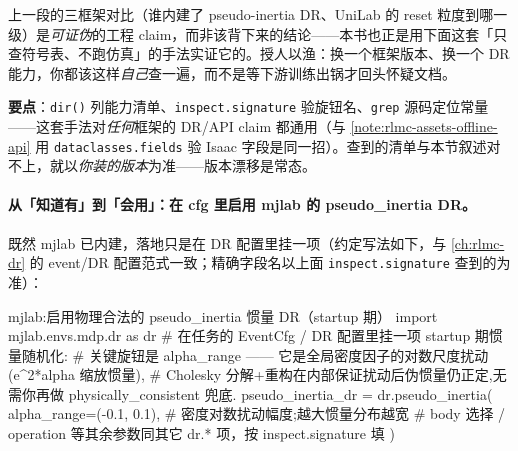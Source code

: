 \begin{note}\label{note:rlmc-assets-verify-claim}
上一段的三框架对比（谁内建了 pseudo-inertia DR、UniLab 的 reset 粒度到哪一级）是\emph{可证伪}的工程 claim，而非该背下来的结论——本书也正是用下面这套「只查符号表、不跑仿真」的手法实证它的。授人以渔：换一个框架版本、换一个 DR 能力，你都该这样\emph{自己}查一遍，而不是等下游训练出锅才回头怀疑文档。
\textbf{要点}：\texttt{dir()} 列能力清单、\texttt{inspect.\allowbreak signature} 验旋钮名、\texttt{grep} 源码定位常量——这套手法对\emph{任何}框架的 DR/API claim 都通用（与 \cref{note:rlmc-assets-offline-api} 用 \texttt{dataclasses.\allowbreak fields} 验 Isaac 字段是同一招）。查到的清单与本节叙述对不上，就以\emph{你装的版本}为准——版本漂移是常态。
\end{note}

\paragraph{从「知道有」到「会用」：在 cfg 里启用 mjlab 的 pseudo\_inertia DR。}既然 mjlab 已内建，落地只是在 DR 配置里挂一项（约定写法如下，与 \cref{ch:rlmc-dr} 的 event/DR 配置范式一致；精确字段名以上面 \texttt{inspect.\allowbreak signature} 查到的为准）：

\begin{codebox}[Python]{mjlab:启用物理合法的 pseudo\_inertia 惯量 DR（startup 期）}
import mjlab.envs.mdp.dr as dr
# 在任务的 EventCfg / DR 配置里挂一项 startup 期惯量随机化:
# 关键旋钮是 alpha_range —— 它是全局密度因子的对数尺度扰动(e^{2*alpha} 缩放惯量),
# Cholesky 分解+重构在内部保证扰动后伪惯量仍正定,无需你再做 physically_consistent 兜底.
pseudo_inertia_dr = dr.pseudo_inertia(
    alpha_range=(-0.1, 0.1),     # 密度对数扰动幅度;越大惯量分布越宽
    # body 选择 / operation 等其余参数同其它 dr.* 项，按 inspect.signature 填
)
\end{codebox}

